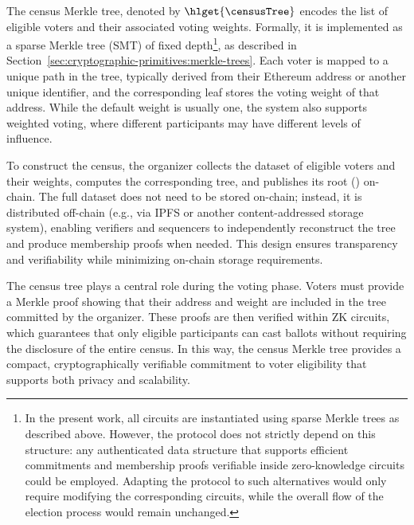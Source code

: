 
The census Merkle tree, denoted by $\hlget{\censusTree}$ encodes the list of eligible voters and their associated voting weights. Formally, it is implemented as a sparse Merkle tree (SMT) of fixed depth\footnote{In the present work, all circuits are instantiated using sparse Merkle trees as described above. However, the protocol does not strictly depend on this structure: any authenticated data structure that supports efficient commitments and membership proofs verifiable inside zero-knowledge circuits could be employed. Adapting the protocol to such alternatives would only require modifying the corresponding circuits, while the overall flow of the election process would remain unchanged.}, as described in Section~\ref{sec:cryptographic-primitives:merkle-trees}. Each voter is mapped to a unique path in the tree, typically derived from their Ethereum address or another unique identifier, and the corresponding leaf stores the voting weight of that address. While the default weight is usually one, the system also supports weighted voting, where different participants may have different levels of influence.

To construct the census, the organizer collects the dataset of eligible voters and their weights, computes the corresponding tree, and publishes its root (\censusroot) on-chain. The full dataset does not need to be stored on-chain; instead, it is distributed off-chain (e.g., via IPFS or another content-addressed storage system), enabling verifiers and sequencers to independently reconstruct the tree and produce membership proofs when needed. This design ensures transparency and verifiability while minimizing on-chain storage requirements.

The census tree plays a central role during the voting phase. Voters must provide a Merkle proof showing that their address and weight are included in the tree committed by the organizer. These proofs are then verified within ZK circuits, which guarantees that only eligible participants can cast ballots without requiring the disclosure of the entire census. In this way, the census Merkle tree provides a compact, cryptographically verifiable commitment to voter eligibility that supports both privacy and scalability.

